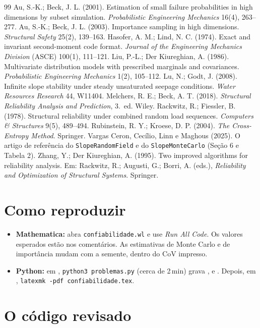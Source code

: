 \documentclass[11pt,a4paper]{article}
\begin{document}
\begin{thebibliography}{99}
 Au, S.-K.; Beck, J. L. (2001). Estimation of small failure probabilities in high dimensions by subset
  simulation. \emph{Probabilistic Engineering Mechanics} 16(4), 263--277.
 Au, S.-K.; Beck, J. L. (2003). Importance sampling in high dimensions. \emph{Structural Safety} 25(2),
  139--163.
 Hasofer, A. M.; Lind, N. C. (1974). Exact and invariant second-moment code format. \emph{Journal of
  the Engineering Mechanics Division} (ASCE) 100(1), 111--121.
 Liu, P.-L.; Der Kiureghian, A. (1986). Multivariate distribution models with prescribed marginals and
  covariances. \emph{Probabilistic Engineering Mechanics} 1(2), 105--112.
 Lu, N.; Godt, J. (2008). Infinite slope stability under steady unsaturated seepage conditions.
  \emph{Water Resources Research} 44, W11404.
 Melchers, R. E.; Beck, A. T. (2018). \emph{Structural Reliability Analysis and Prediction}, 3.\ ed.
  Wiley.
 Rackwitz, R.; Fiessler, B. (1978). Structural reliability under combined random load sequences.
  \emph{Computers \& Structures} 9(5), 489--494.
 Rubinstein, R. Y.; Kroese, D. P. (2004). \emph{The Cross-Entropy Method}. Springer.
 Vargas Ceron, Cecílio, Linn e Maghous (2025). O artigo de referência do \texttt{SlopeRandomField} e do
  \texttt{SlopeMonteCarlo} (Seção 6 e Tabela 2).
 Zhang, Y.; Der Kiureghian, A. (1995). Two improved algorithms for reliability analysis. Em: Rackwitz,
  R.; Augusti, G.; Borri, A. (eds.), \emph{Reliability and Optimization of Structural Systems}. Springer.
\end{thebibliography}

\appendix
\section{Como reproduzir}
\begin{itemize}
  \item \textbf{Mathematica:} abra \texttt{confiabilidade.wl} e use \emph{Run All Code}. Os valores esperados estão nos
    comentários. As estimativas de Monte Carlo e de importância mudam com a semente, dentro do CoV impresso.
  \item \textbf{Python:} em , \texttt{python3 problemas.py} (cerca de 2\,min) grava
    ,  e . Depois, em ,
    \texttt{latexmk -pdf confiabilidade.tex}.
\end{itemize}

\section{O código revisado}

\end{document}
